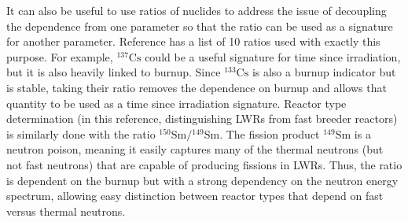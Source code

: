 It can also be useful to use ratios of nuclides to address the issue of
decoupling the dependence from one parameter so that the ratio can be used as a
signature for another parameter.  Reference \cite{mll_method} has a list of 10
ratios used with exactly this purpose.  For example, ${}^{137}\text{Cs}$ could
be a useful signature for time since irradiation, but it is also heavily linked
to burnup.  Since ${}^{133}\text{Cs}$ is also a burnup indicator but is stable,
taking their ratio removes the dependence on burnup and allows that quantity to
be used as a time since irradiation signature.  Reactor type determination (in
this reference, distinguishing \glspl{LWR} from fast breeder reactors) is
similarly done with the ratio ${}^{150}\text{Sm}/{}^{149}\text{Sm}$.  The
fission product ${}^{149}\text{Sm}$ is a neutron poison, meaning it easily
captures many of the thermal neutrons (but not fast neutrons) that are capable
of producing fissions in \glspl{LWR}. Thus, the ratio is dependent on the
burnup but with a strong dependency on the neutron energy spectrum, allowing
easy distinction between reactor types that depend on fast versus thermal
neutrons. 


